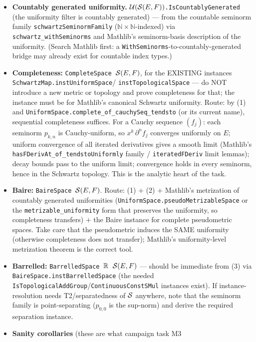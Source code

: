 \documentclass[11pt]{article}
\theoremstyle{plain}
\theoremstyle{remark}
\begin{document}
\begin{itemize}
\item[(1)] \textbf{Countably generated uniformity.}
$\mathcal U(\mathcal{S}(E,F))$\texttt{.IsCountablyGenerated} (the uniformity
filter is countably generated) --- from the countable
seminorm family \texttt{schwartzSeminormFamily} ($\mathbb N\times\mathbb
N$-indexed) via \texttt{schwartz\_withSeminorms} and Mathlib's
seminorm-basis description of the uniformity. (Search Mathlib first: a
\texttt{WithSeminorms}-to-countably-generated bridge may already exist
for countable index types.)
\item[(2)] \textbf{Completeness:} \texttt{CompleteSpace $\mathcal{S}(E,F)$},
for the EXISTING instances \texttt{SchwartzMap.instUniformSpace}/%
\texttt{instTopologicalSpace} --- do NOT introduce a new metric or
topology and prove completeness for that; the instance must be for
Mathlib's canonical Schwartz uniformity. Route: by (1) and
\texttt{UniformSpace.complete\_of\_cauchySeq\_tendsto} (or its current
name), sequential completeness suffices. For a Cauchy sequence $(f_j)$:
each seminorm $p_{k,n}$ is Cauchy-uniform, so $x^k\,\partial^n f_j$
converges uniformly on $E$; uniform convergence of all iterated
derivatives gives a smooth limit (Mathlib's
\texttt{hasFDerivAt\_of\_tendstoUniformly} family /
\texttt{iteratedFDeriv} limit lemmas); decay bounds pass to the uniform
limit; convergence holds in every seminorm, hence in the Schwartz
topology. This is the analytic heart of the task.
\item[(3)] \textbf{Baire:} \texttt{BaireSpace $\mathcal{S}(E,F)$}. Route: (1)
$+$ (2) $+$ Mathlib's metrization of countably generated uniformities
(\texttt{UniformSpace.pseudoMetrizableSpace} or the
\texttt{metrizable\_uniformity} form that preserves the uniformity, so
completeness transfers) $+$ the Baire instance for complete pseudometric
spaces. Take care that the pseudometric induces the SAME uniformity
(otherwise completeness does not transfer); Mathlib's uniformity-level
metrization theorem is the correct tool.
\item[(4)] \textbf{Barrelled:} \texttt{BarrelledSpace $\mathbb{R}$ $\mathcal{S}(E,F)$}
--- should be immediate from (3) via
\texttt{BaireSpace.instBarrelledSpace} (the needed
\texttt{IsTopologicalAddGroup}/\texttt{ContinuousConstSMul} instances
exist). If instance-resolution needs T2/separatedness of $\mathcal{S}$ anywhere,
note that the seminorm family is point-separating ($p_{0,0}$ is the
sup-norm) and derive the required separation instance.
\item[(5)] \textbf{Sanity corollaries} (these are what campaign task M3

\end{itemize}
\end{document}

